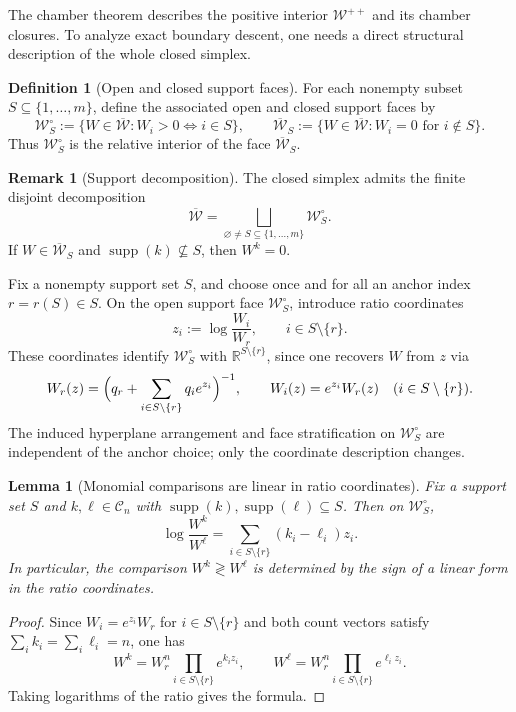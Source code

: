 \documentclass[11pt]{article}
\newtheorem{lemma}[lemma]{Lemma}
\theoremstyle{definition}
\newtheorem{definition}[definition]{Definition}
\newtheorem{remark}[remark]{Remark}
\newcommand{\R}{\mathbb{R}}
\newcommand{\1}{\mathbf{1}}
\newcommand{\supp}{\operatorname{supp}}
\begin{document}
The chamber theorem describes the positive interior $\mathcal W^{++}$ and its chamber closures. To analyze exact boundary descent, one needs a direct structural description of the whole closed simplex.

\begin{definition}[Open and closed support faces]
For each nonempty subset $S\subseteq\{1,\dots,m\}$, define the associated open and closed support faces by
\[
\mathcal W_S^\circ:=\{W\in\overline{\mathcal W}: W_i>0 \iff i\in S\},
\qquad
\overline{\mathcal W}_S:=\{W\in\overline{\mathcal W}: W_i=0 \text{ for } i\notin S\}.
\]
Thus $\mathcal W_S^\circ$ is the relative interior of the face $\overline{\mathcal W}_S$.
\end{definition}

\begin{remark}[Support decomposition]
The closed simplex admits the finite disjoint decomposition
\[
\overline{\mathcal W}=\bigsqcup_{\varnothing\neq S\subseteq\{1,\dots,m\}} \mathcal W_S^\circ.
\]
If $W\in\overline{\mathcal W}_S$ and $\supp(k)\not\subseteq S$, then $W^k=0$.
\end{remark}

Fix a nonempty support set $S$, and choose once and for all an anchor index $r=r(S)\in S$. On the open support face $\mathcal W_S^\circ$, introduce ratio coordinates
\[
z_i:=\log\frac{W_i}{W_r},
\qquad i\in S\setminus\{r\}.
\]
These coordinates identify $\mathcal W_S^\circ$ with $\R^{S\setminus\{r\}}$, since one recovers $W$ from $z$ via
\begin{equation}\label{eq:ratio-param}
W_r(z)=\Bigl(q_r+\sum_{i\in S\setminus\{r\}} q_i e^{z_i}\Bigr)^{-1},
\qquad
W_i(z)=e^{z_i}W_r(z)
\quad (i\in S\setminus\{r\}).
\end{equation}
The induced hyperplane arrangement and face stratification on $\mathcal W_S^\circ$ are independent of the anchor choice; only the coordinate description changes.

\begin{lemma}[Monomial comparisons are linear in ratio coordinates]\label{lem:ratio-linear}
Fix a support set $S$ and $k,\ell\in\mathcal C_n$ with $\supp(k),\supp(\ell)\subseteq S$. Then on $\mathcal W_S^\circ$,
\[
\log\frac{W^k}{W^\ell}
=
\sum_{i\in S\setminus\{r\}} (k_i-\ell_i) z_i.
\]
In particular, the comparison $W^k\gtrless W^\ell$ is determined by the sign of a linear form in the ratio coordinates.
\end{lemma}

\begin{proof}
Since $W_i=e^{z_i}W_r$ for $i\in S\setminus\{r\}$ and both count vectors satisfy $\sum_i k_i=\sum_i \ell_i=n$, one has
\[
W^k=W_r^n \prod_{i\in S\setminus\{r\}} e^{k_i z_i},
\qquad
W^\ell=W_r^n \prod_{i\in S\setminus\{r\}} e^{\ell_i z_i}.
\]
Taking logarithms of the ratio gives the formula.
\end{proof}
\end{document}
